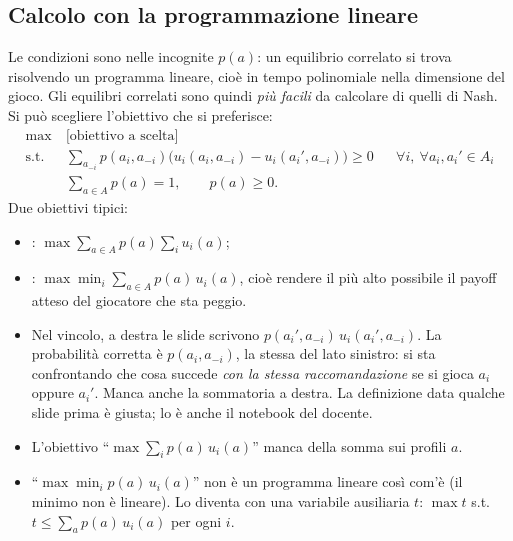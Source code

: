 \subsection{Calcolo con la programmazione lineare}

Le condizioni sono  nelle incognite $p(a)$: un equilibrio correlato si trova
risolvendo un programma lineare, cioè in tempo polinomiale nella dimensione del gioco.
Gli equilibri correlati sono quindi \emph{più facili} da calcolare di quelli di Nash. Si può
scegliere l'obiettivo che si preferisce:
\[
\begin{aligned}
  \max\ & \text{[obiettivo a scelta]}\\
  \text{s.t. }\ & \sum_{a_{-i}} p(a_i, a_{-i})\bigl(u_i(a_i, a_{-i}) - u_i(a_i', a_{-i})\bigr) \ge 0
  && \forall i,\ \forall a_i, a_i' \in A_i\\
  & \textstyle\sum_{a \in A} p(a) = 1,\qquad p(a) \ge 0 .
\end{aligned}
\]
Due obiettivi tipici:
\begin{itemize}
  \item {}: $\max \sum_{a \in A} p(a) \sum_i u_i(a)$;
  \item {}: $\max \min_i \sum_{a \in A} p(a)\,u_i(a)$, cioè rendere il più
        alto possibile il payoff atteso del giocatore che sta peggio.
\end{itemize}

\begin{attenzione}
\begin{itemize}
  \item Nel vincolo, a destra le slide scrivono $p(a_i', a_{-i})\,u_i(a_i', a_{-i})$. La
        probabilità corretta è $p(a_i, a_{-i})$, la stessa del lato sinistro: si sta
        confrontando che cosa succede \emph{con la stessa raccomandazione} se si gioca
        $a_i$ oppure $a_i'$. Manca anche la sommatoria a destra. La definizione data
        qualche slide prima è giusta; lo è anche il notebook del docente.
  \item L'obiettivo ``$\max \sum_i p(a)\,u_i(a)$'' manca della somma sui profili $a$.
  \item ``$\max\min_i p(a)\,u_i(a)$'' non è un programma lineare così com'è (il minimo non
        è lineare). Lo diventa con una variabile ausiliaria $t$:
        $\max t$ s.t.\ $t \le \sum_a p(a)\,u_i(a)$ per ogni $i$.
\end{itemize}
\end{attenzione}

